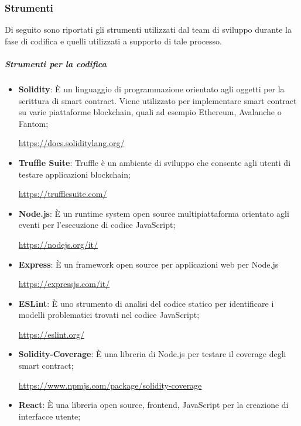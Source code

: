 \subsubsection{Strumenti}\label{sssec:Strumenti}
Di seguito sono riportati gli strumenti utilizzati dal team di sviluppo durante la fase di codifica e quelli utilizzati a supporto di tale processo.
\subparagraph{Strumenti per la codifica}
\begin{itemize}
    \item \textbf{Solidity}: È un linguaggio di programmazione orientato agli oggetti per la scrittura di smart contract\glo{}. Viene utilizzato per implementare smart contract\glo{} su varie piattaforme blockchain\glo{}, quali ad esempio Ethereum\glo{}, Avalanche\glo{} o Fantom\glo{};
          \begin{center}\url{https://docs.soliditylang.org/}\end{center}
    \item \textbf{Truffle Suite}:
          Truffle è un ambiente di sviluppo che consente agli utenti di testare applicazioni blockchain\glo{};
          \begin{center}\url{https://trufflesuite.com/}\end{center}
    \item \textbf{Node.js}: È un runtime system\glo{} open source\glo{} multipiattaforma orientato agli eventi per l'esecuzione di codice JavaScript\glo{};
          \begin{center}\url{https://nodejs.org/it/}\end{center}
    \item \textbf{Express}: È un framework\glo{} open source\glo{} per applicazioni web per Node.js
          \begin{center}\url{https://expressjs.com/it/}\end{center}
    \item \textbf{ESLint}: È uno strumento di analisi del codice statico per identificare i modelli problematici trovati nel codice JavaScript\glo{};
          \begin{center}\url{https://eslint.org/}\end{center}
    \item \textbf{Solidity-Coverage}: È una libreria di Node.js per testare il coverage degli smart contract\glo{};
          \begin{center}\url{https://www.npmjs.com/package/solidity-coverage}\end{center}
    \item \textbf{React}: È una libreria open source\glo{}, frontend\glo{}, JavaScript\glo{} per la creazione di interfacce utente;

\end{itemize}
